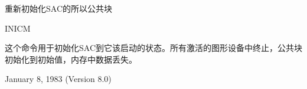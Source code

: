 \label{cmd:inicm}

重新初始化SAC的所以公共块

INICM

这个命令用于初始化SAC到它该启动的状态。所有激活的图形设备中终止，公共块初始化到初始值，内存中数据丢失。

January 8, 1983 (Version 8.0)

